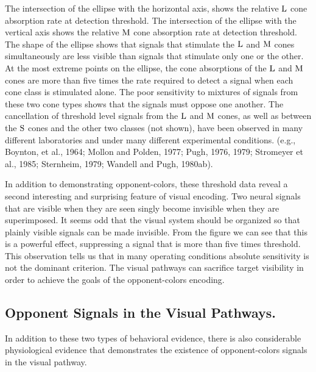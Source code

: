 The intersection of the ellipse with the horizontal axis, shows the
relative $\mbox{L}$ cone absorption rate at detection threshold.  The
intersection of the ellipse with the vertical axis shows the relative
$\mbox{M}$ cone absorption rate at detection threshold.  The shape of
the ellipse shows that signals that stimulate the $\mbox{L}$ and $\mbox{M}$
cones simultaneously are less visible than signals that stimulate only
one or the other.  At the most extreme points on the ellipse, the cone
absorptions of the $\mbox{L}$ and $\mbox{M}$ cones are more than five times
the rate required to detect a signal when each cone class is
stimulated alone.  The poor sensitivity to mixtures of signals from
these two cone types shows that the signals must oppose one another.
The cancellation of threshold level signals from the $\mbox{L}$ and
$\mbox{M}$ cones, as well as between the $\mbox{S}$ cones and the other two
classes (not shown), have been observed in many different laboratories
and under many different experimental conditions. (e.g., Boynton, et
al., 1964; Mollon and Polden, 1977; Pugh, 1976, 1979; Stromeyer et
al., 1985; Sternheim, 1979; Wandell and Pugh, 1980ab).


In addition to demonstrating opponent-colors, these threshold data
reveal a second interesting and surprising feature of visual
encoding.  Two neural signals that are visible when they are seen
singly become invisible when they are superimposed.  It seems odd
that the visual system should be organized so that plainly visible
signals can be made invisible.  From the figure we can see that this
is a powerful effect, suppressing a signal that is more than five
times threshold.  This observation tells us that in many operating
conditions absolute sensitivity is not the dominant criterion.  The
visual pathways can sacrifice target visibility in order to achieve
the goals of the opponent-colors encoding.

\subsection*{Opponent Signals in the Visual Pathways.  }
In addition to these two types of behavioral evidence, there is also
considerable physiological evidence that demonstrates the existence of
opponent-colors signals in the visual pathway.

